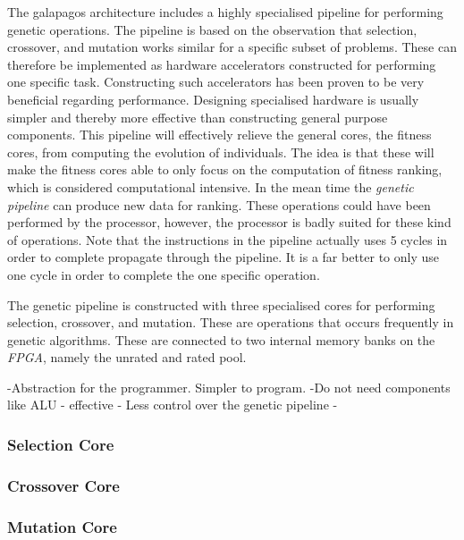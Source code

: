 The galapagos architecture includes a highly specialised pipeline for performing genetic operations. The pipeline is based on the observation that selection, crossover, and mutation works similar for a specific subset of problems. These can therefore be implemented as hardware accelerators constructed for performing one specific task. Constructing such accelerators has been proven to be very beneficial regarding performance. Designing specialised hardware is usually simpler and thereby more effective than constructing general purpose components. This pipeline will effectively relieve the general cores, the fitness cores, from computing the evolution of individuals. The idea is that these will make the fitness cores able to only focus on the computation of fitness ranking, which is considered computational intensive. In the mean time the \emph{genetic pipeline} can produce new data for ranking. These operations could have been performed by the processor, however, the processor is badly suited for these kind of operations. Note that the instructions in the pipeline actually uses 5 cycles in order to complete propagate through the pipeline. It is a far better to only use one cycle in order to complete the one specific operation.  

The genetic pipeline is constructed with three specialised cores for performing selection, crossover, and mutation. These are operations that occurs frequently in genetic algorithms. These are connected to two internal memory banks on the \emph{FPGA}, namely the unrated and rated pool.


-Abstraction for the programmer. Simpler to program.
-Do not need components like ALU
- effective 
- Less control over the genetic pipeline
- 


\subsubsection {Selection Core} \label{fpga:selection:ss:selection_core}
     \label{fpga:subsection:selection_core}

\subsubsection{Crossover Core} \label{fpga:crossover:ss:crossover_core}
     \label{fpga:subsection:crossover_core}

\subsubsection{Mutation Core}\label{fpga:mutation:ss:mutation_core}
     \label{fpga:subsection:mutation_core}


